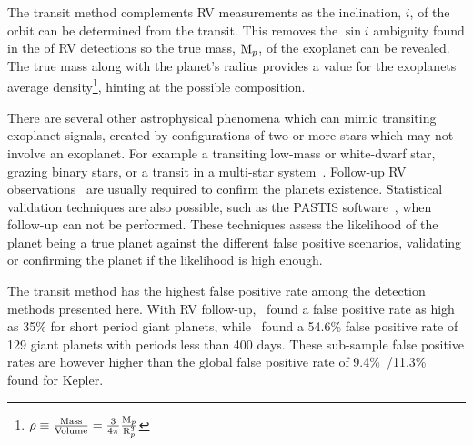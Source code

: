 The transit method complements {RV} measurements as the inclination, $i$, of the orbit can be determined from the transit.
This removes the {$\sin{i}$} ambiguity found in the \Mpsini{} of {RV} detections so the true mass, $\textrm{M}_{p}$, of the exoplanet can be revealed.
The true mass along with the planet's radius provides a value for the exoplanets average density\footnote{$\rho \equiv \frac{\textrm{Mass}}{\textrm{Volume}} = \frac{3}{4\pi}\frac{\textrm{M}_{p}}{\textrm{R}_{p}^{3}}$}, hinting at the possible composition.

There are several other astrophysical phenomena which can mimic transiting exoplanet signals, created by configurations of two or more stars which may not involve an exoplanet.
For example a transiting low-mass or white-dwarf star, grazing binary stars, or a transit in a multi-star system~\citep[see e.g.][]{cameron_extrasolar_2012, santerne_contribution_2013}.
Follow-up {RV} observations~\citep[e.g.][]{santerne_radial_2011} are usually required to confirm the planets existence.
Statistical validation techniques are also possible, such as the PASTIS software~\citep{diaz_pastis_2014}, when follow-up can not be performed.
These techniques assess the likelihood of the planet being a true planet against the different false positive scenarios, validating or confirming the planet if the likelihood is high enough.

The transit method has the highest false positive rate among the detection methods presented here.
With {RV} follow-up,~\citet{santerne_sophie_2012} found a false positive rate as high as 35\% for short period giant planets, while~\citet{santerne_sophie_2016} found a 54.6\% false positive rate of 129 giant planets with periods less than 400 days.
These sub-sample false positive rates are however higher than the global false positive rate of 9.4\%~\citep{fressin_false_2013}/11.3\%~\citep{santerne_contribution_2013} found for Kepler.


